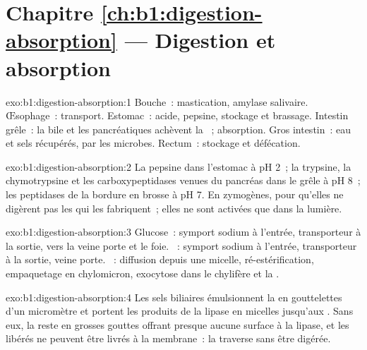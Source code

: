 \section*{Chapitre \ref{ch:b1:digestion-absorption} --- Digestion et absorption}

\begin{solution}{exo:b1:digestion-absorption:1}
Bouche~: mastication, amylase salivaire. Œsophage~: transport.
Estomac~: acide, pepsine, stockage et brassage. Intestin grêle~: la
bile et les  pancréatiques achèvent la ~; absorption.
Gros intestin~: eau et sels récupérés,  par les microbes.
Rectum~: stockage et défécation.
\end{solution}

\begin{solution}{exo:b1:digestion-absorption:2}
La pepsine dans l'estomac à pH 2~; la trypsine, la chymotrypsine et les
carboxypeptidases venues du pancréas dans le grêle à pH 8~; les
peptidases de la bordure en brosse à pH 7. En zymogènes, pour qu'elles
ne digèrent pas les  qui les fabriquent~; elles ne sont activées
que dans la lumière.
\end{solution}

\begin{solution}{exo:b1:digestion-absorption:3}
Glucose~: symport sodium à l'entrée, transporteur à la sortie, vers la
veine porte et le foie. ~: symport sodium à l'entrée,
transporteur à la sortie, veine porte. ~: diffusion depuis
une micelle, ré-estérification, empaquetage en chylomicron, exocytose
dans le chylifère et la .
\end{solution}

\begin{solution}{exo:b1:digestion-absorption:4}
Les sels biliaires émulsionnent la  en gouttelettes d'un
micromètre et portent les produits de la lipase en micelles jusqu'aux
. Sans eux, la  reste en grosses gouttes offrant
presque aucune surface à la lipase, et les  libérés ne
peuvent être livrés à la membrane~: la  traverse sans être
digérée.
\end{solution}

